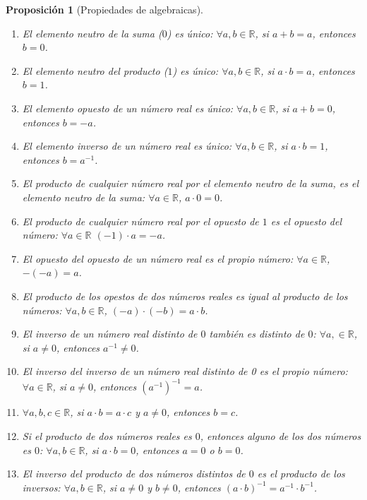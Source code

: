 \documentclass[
  a4paper,
]{scrreport}
\theoremstyle{plain}
\theoremstyle{plain}
\newtheorem{proposition}{Proposición}[chapter]
\theoremstyle{definition}
\theoremstyle{definition}
\theoremstyle{plain}
\theoremstyle{remark}
\begin{document}
\begin{proposition}[Propiedades de
algebraicas]
\begin{enumerate}
\def\labelenumi{\alph{enumi}.}
\item
  El elemento neutro de la suma (\(0\)) es único:
  \(\forall a,b\in \mathbb{R}\), si \(a+b=a\), entonces \(b=0\).
\item
  El elemento neutro del producto (\(1\)) es único:
  \(\forall a,b\in \mathbb{R}\), si \(a\cdot b = a\), entonces \(b=1\).
\item
  El elemento opuesto de un número real es único:
  \(\forall a,b\in \mathbb{R}\), si \(a+b=0\), entonces \(b=-a\).
\item
  El elemento inverso de un número real es único:
  \(\forall a,b\in \mathbb{R}\), si \(a\cdot b=1\), entonces
  \(b=a^{-1}\).
\item
  El producto de cualquier número real por el elemento neutro de la
  suma, es el elemento neutro de la suma: \(\forall a\in\mathbb{R}\),
  \(a\cdot 0 = 0\).
\item
  El producto de cualquier número real por el opuesto de \(1\) es el
  opuesto del número: \(\forall a\in\mathbb{R}\) \((-1)\cdot a = -a\).
\item
  El opuesto del opuesto de un número real es el propio número:
  \(\forall a\in\mathbb{R}\), \(-(-a)=a\).
\item
  El producto de los opestos de dos números reales es igual al producto
  de los números: \(\forall a,b\in\mathbb{R}\),
  \((-a) \cdot (-b) = a\cdot b\).
\item
  El inverso de un número real distinto de \(0\) también es distinto de
  \(0\): \(\forall a,\in\mathbb{R}\), si \(a\neq 0\), entonces
  \(a^{-1}\neq 0\).
\item
  El inverso del inverso de un número real distinto de 0 es el propio
  número: \(\forall a\in\mathbb{R}\), si \(a\neq 0\), entonces
  \((a^{-1})^{-1}=a\).
\item
  \(\forall a,b,c\in \mathbb{R}\), si \(a\cdot b=a\cdot c\) y
  \(a\neq 0\), entonces \(b=c\).
\item
  Si el producto de dos números reales es \(0\), entonces alguno de los
  dos números es \(0\): \(\forall a,b\in\mathbb{R}\), si \(a\cdot b=0\),
  entonces \(a=0\) o \(b=0\).
\item
  El inverso del producto de dos números distintos de \(0\) es el
  producto de los inversos: \(\forall a,b\in \mathbb{R}\), si
  \(a\neq 0\) y \(b\neq 0\), entonces
  \((a\cdot b)^{-1} = a^{-1}\cdot b^{-1}\).
\end{enumerate}

\end{proposition}
\end{document}
